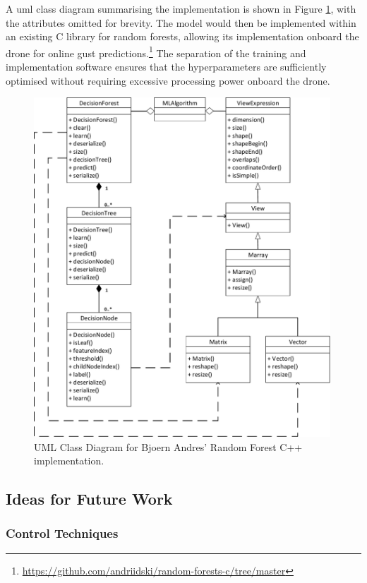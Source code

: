 A \gls{uml} class diagram summarising the implementation is shown in Figure \ref{fig:uml}, with the attributes omitted for brevity. The model would then be implemented within an existing C library for random forests, allowing its implementation onboard the drone for online gust predictions.\footnote{\url{https://github.com/andriidski/random-forests-c/tree/master}} The separation of the training and implementation software ensures that the hyperparameters are sufficiently optimised without requiring excessive processing power onboard the drone.

\begin{figure}[H]
\centering
\includegraphics[width=0.99\textwidth]{figs/Samuel/Figures/UML Random Forest-cropped.pdf}
\caption{UML Class Diagram for Bjoern Andres' Random Forest C++ implementation.}
\label{fig:uml}
\end{figure}




\subsection{Ideas for Future Work}

\subsubsection{Control Techniques}

